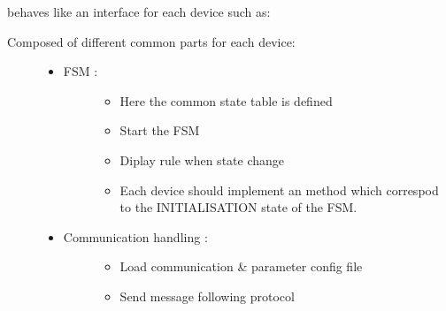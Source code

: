 \documentclass[letterpaper,10pt,english]{sphinxmanual}
\begin{document}
behaves like an interface for each device such as:
\begin{description}
\item[{Composed of different common parts for each device:}] \leavevmode\begin{itemize}
\item {} \begin{description}
\item[{FSM :}] \leavevmode\begin{itemize}
\item {} 
Here the common state table is defined

\item {} 
Start the FSM

\item {} 
Diplay rule when state change

\item {} 
Each device should implement an  method which correspod to the INITIALISATION state of the FSM.

\end{itemize}

\end{description}

\item {} \begin{description}
\item[{Communication handling :}] \leavevmode\begin{itemize}
\item {} 
Load communication \& parameter config file

\item {} 
Send message following protocol

\end{itemize}

\end{description}

\end{itemize}

\end{description}
\end{document}
